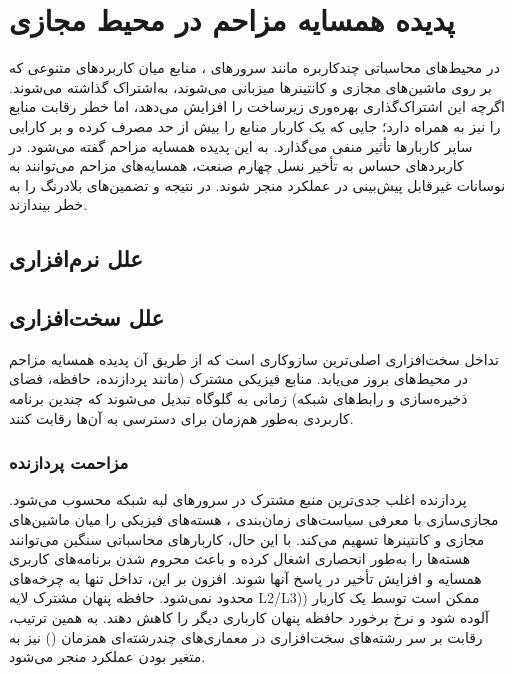 \section{پدیده همسایه مزاحم در محیط مجازی}

در محیط‌های محاسباتی چندکاربره مانند سرورهای ، منابع میان کاربردهای متنوعی که بر روی ماشین‌های مجازی و کانتینرها میزبانی می‌شوند، به‌اشتراک گذاشته می‌شوند. اگرچه این اشتراک‌گذاری بهره‌وری زیرساخت را افزایش می‌دهد، اما خطر رقابت منابع را نیز به همراه دارد؛ جایی که یک کاربار منابع را بیش از حد مصرف کرده و بر کارایی سایر کاربارها تأثیر منفی می‌گذارد. به این پدیده همسایه مزاحم گفته می‌شود. در کاربردهای حساس به تأخیر نسل چهارم صنعت، همسایه‌های مزاحم می‌توانند به نوسانات غیرقابل پیش‌بینی در عملکرد منجر شوند. در نتیجه  و تضمین‌های بلادرنگ را به خطر بیندازند.

\subsection{علل نرم‌افزاری}



\subsection{علل سخت‌افزاری}

تداخل سخت‌افزاری اصلی‌ترین سازوکاری است که از طریق آن پدیده همسایه مزاحم در محیط‌های  بروز می‌یابد. منابع فیزیکی مشترک (مانند پردازنده‌، حافظه، فضای ذخیره‌سازی و رابط‌های شبکه) زمانی به گلوگاه تبدیل می‌شوند که چندین برنامه کاربردی به‌طور هم‌زمان برای دسترسی به آن‌ها رقابت کنند.

\subsubsection{مزاحمت پردازنده}

پردازنده اغلب جدی‌ترین منبع مشترک در سرورهای لبه شبکه محسوب می‌شود. مجازی‌سازی با معرفی سیاست‌های زمان‌بندی ، هسته‌های فیزیکی را میان ماشین‌های مجازی و کانتینرها تسهیم‌ می‌کند. با این حال، کاربارهای محاسباتی سنگین می‌توانند هسته‌ها را به‌طور انحصاری اشغال کرده و باعث محروم شدن برنامه‌های کاربری همسایه و افزایش تأخیر در پاسخ آنها شوند. افزون بر این، تداخل تنها به چرخه‌های  محدود نمی‌شود. حافظه پنهان مشترک لایه L2/L3)) ممکن است توسط یک کاربار آلوده شود و نرخ برخورد حافظه پنهان کارباری دیگر را کاهش دهند. به همین ترتیب، رقابت بر سر رشته‌های سخت‌افزاری در معماری‌های چندرشته‌ای همزمان ()  نیز به متغیر بودن عملکرد منجر می‌شود.

